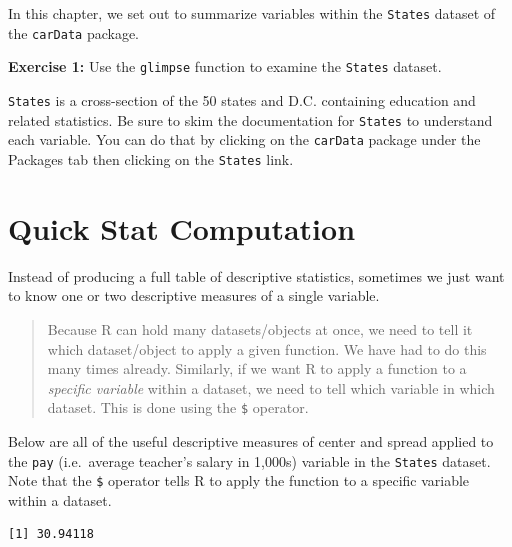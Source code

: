 \documentclass[
]{book}
\makeatletter
\newenvironment{Shaded}{\begin{snugshade}}{\end{snugshade}}
\newcommand{\FunctionTok}[1]{\textcolor[rgb]{0.27,0.27,0.27}{\textbf{#1}}}
\newcommand{\NormalTok}[1]{#1}
\newcommand{\SpecialCharTok}[1]{\textcolor[rgb]{0.43,0.43,0.43}{\textbf{#1}}}
\newenvironment{kframe}{%
\medskip{}
\setlength{\fboxsep}{.8em}
 \def\at@end@of@kframe{}%
 \ifinner\ifhmode%
  \def\at@end@of@kframe{\end{minipage}}%
  \begin{minipage}{\columnwidth}%
 \fi\fi%
 \def\FrameCommand##1{\hskip\@totalleftmargin \hskip-\fboxsep
 \colorbox{shadecolor}{##1}\hskip-\fboxsep
     \hskip-\linewidth \hskip-\@totalleftmargin \hskip\columnwidth}%
 \MakeFramed {\advance\hsize-\width
   \@totalleftmargin\z@ \linewidth\hsize
   \@setminipage}}%
 {\par\unskip\endMakeFramed%
 \at@end@of@kframe}
\renewenvironment{Shaded}{\begin{kframe}}{\end{kframe}}
\newenvironment{rmdblock}[1]
  {\begin{shaded*}
  }
  {\end{shaded*}
  }
\newenvironment{learncheck}
  {\begin{rmdblock}{warning}}
  {\end{rmdblock}}
\makeatother
\begin{document}
In this chapter, we set out to summarize variables within the \texttt{States} dataset of the \texttt{carData} package.

\begin{learncheck}
\textbf{Exercise 1:} Use the \texttt{glimpse} function to examine the
\texttt{States} dataset.
\end{learncheck}

\texttt{States} is a cross-section of the 50 states and D.C. containing education and related statistics. Be sure to skim the documentation for \texttt{States} to understand each variable. You can do that by clicking on the \texttt{carData} package under the Packages tab then clicking on the \texttt{States} link.

\hypertarget{quick-stat-computation}{%
\section{Quick Stat Computation}\label{quick-stat-computation}}

Instead of producing a full table of descriptive statistics, sometimes we just want to know one or two descriptive measures of a single variable.

\begin{quote}
Because R can hold many datasets/objects at once, we need to tell it which dataset/object to apply a given function. We have had to do this many times already. Similarly, if we want R to apply a function to a \emph{specific variable} within a dataset, we need to tell which variable in which dataset. This is done using the \texttt{\$} operator.
\end{quote}

Below are all of the useful descriptive measures of center and spread applied to the \texttt{pay} (i.e.~average teacher's salary in 1,000s) variable in the \texttt{States} dataset. Note that the \texttt{\$} operator tells R to apply the function to a specific variable within a dataset.

\begin{Shaded}
\end{Shaded}

\begin{verbatim}
[1] 30.94118
\end{verbatim}

\begin{Shaded}
\end{Shaded}
\end{document}

